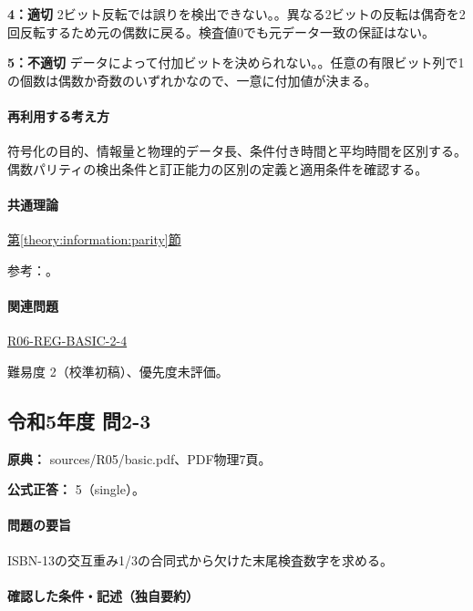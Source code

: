 \noindent\textbf{4：適切} 2ビット反転では誤りを検出できない。。異なる2ビットの反転は偶奇を2回反転するため元の偶数に戻る。検査値0でも元データ一致の保証はない。\par

\noindent\textbf{5：不適切} データによって付加ビットを決められない。。任意の有限ビット列で1の個数は偶数か奇数のいずれかなので、一意に付加値が決まる。\par

\paragraph{再利用する考え方} 符号化の目的、情報量と物理的データ長、条件付き時間と平均時間を区別する。偶数パリティの検出条件と訂正能力の区別の定義と適用条件を確認する。

\paragraph{共通理論} \hyperref[theory:information:parity]{第\ref*{theory:information:parity}節}

\par 参考：\cite{info_errors}。

\paragraph{関連問題} \hyperref[q:r06-reg-basic-2-4]{R06-REG-BASIC-2-4}

\par 難易度 2（校準初稿）、優先度未評価。

\subsection{令和5年度 問2-3}
\label{q:r05-reg-basic-2-3}

\noindent\textbf{原典：} sources/R05/basic.pdf、PDF物理7頁。

\textbf{公式正答：} 5（single）。

\paragraph{問題の要旨} ISBN-13の交互重み1/3の合同式から欠けた末尾検査数字を求める。

\paragraph{確認した条件・記述（独自要約）}\mbox{}\par

